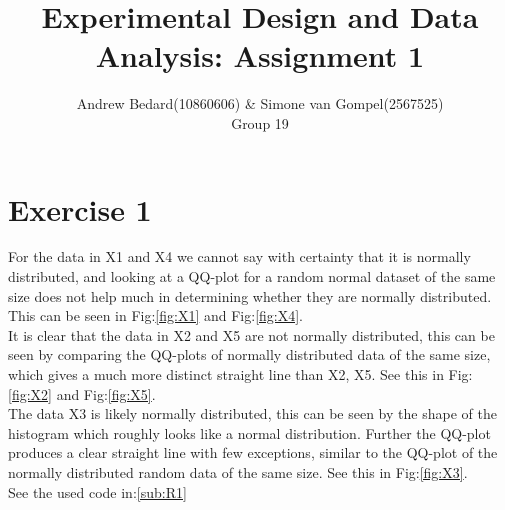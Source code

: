 \documentclass{article}
\title{Experimental Design and Data Analysis: Assignment 1}
\author{Andrew Bedard(10860606) \& Simone van Gompel(2567525) \\ Group 19}
\begin{document}
  \maketitle

  \section{Exercise 1}
    For the data in X1 and X4 we cannot say with certainty that it is normally distributed, and looking at a QQ-plot for a random normal dataset of the same size does not help much in determining whether they are normally distributed. This can be seen in Fig:\ref{fig:X1} and Fig:\ref{fig:X4}.\\
    It is clear that the data in X2 and X5 are not normally distributed, this can be seen by comparing the QQ-plots of normally distributed data of the same size, which gives a much more distinct straight line than X2, X5.
    See this in Fig:\ref{fig:X2} and Fig:\ref{fig:X5}.\\
    The data X3 is likely normally distributed, this can be seen by the shape of the histogram which roughly looks like a normal distribution. Further the QQ-plot produces a clear straight line with few exceptions, similar to the QQ-plot of the normally distributed random data of the same size.
    See this in Fig:\ref{fig:X3}.\\
    See the used code in:\ref{sub:R1}
\end{document}
